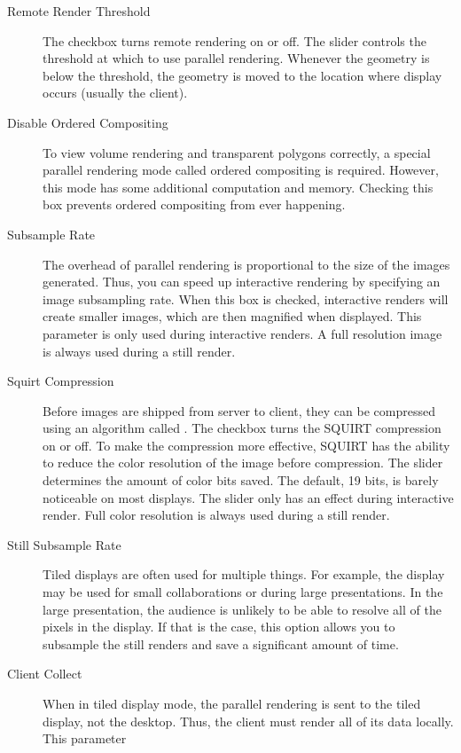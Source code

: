 \begin{description}
\item[Remote Render Threshold]  The checkbox
  turns remote rendering on or off.  The slider controls the threshold at
  which to use parallel rendering.  Whenever the geometry is below the
  threshold, the geometry is moved to the location where display occurs
  (usually the client).
\item[Disable Ordered Compositing]  To view
  volume rendering and transparent polygons correctly, a special parallel
  rendering mode called ordered compositing is required.  However, this
  mode has some additional computation and memory.  Checking this box
  prevents ordered compositing from ever happening.
\item[Subsample Rate]  The overhead of parallel rendering
  is proportional to the size of the images generated.  Thus, you can speed
  up interactive rendering by specifying an image subsampling rate.  When
  this box is checked, interactive renders will create smaller images,
  which are then magnified when displayed.  This parameter is only used
  during interactive renders.  A full resolution image is always used
  during a still render.
\item[Squirt Compression] Before images are shipped from server to client,
  they can be compressed using an algorithm called .  The
  checkbox turns the SQUIRT compression on or off.  To make the compression
  more effective, SQUIRT has the ability to reduce the color resolution of
  the image before compression.  The slider determines the amount of color
  bits saved.  The default, 19 bits, is barely noticeable on most displays.
  The slider only has an effect during interactive render.  Full color
  resolution is always used during a still render.
\item[Still Subsample Rate] Tiled displays are often used for multiple
  things.  For example, the display may be used for small collaborations or
  during large presentations.  In the large presentation, the audience is
  unlikely to be able to resolve all of the pixels in the display.  If that
  is the case, this option allows you to subsample the still renders and
  save a significant amount of time.
\item[Client Collect]  When in tiled display mode,
  the parallel rendering is sent to the tiled display, not the desktop.
  Thus, the client must render all of its data locally.  This parameter

\end{description}
